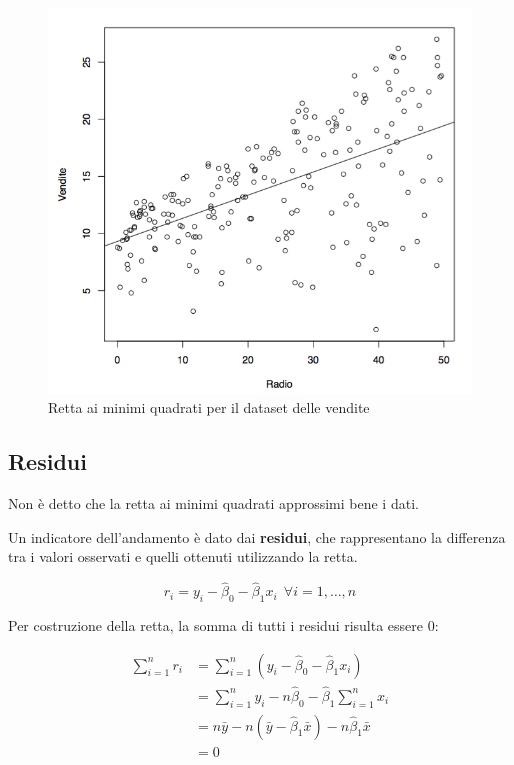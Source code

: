 \begin{figure}[htbp]
\centering
\includegraphics{./notes/immagini/l3-figura5.png}
\caption{Retta ai minimi quadrati per il dataset delle vendite}
\end{figure}

\subsection{Residui}\label{residui}

Non è detto che la retta ai minimi quadrati approssimi bene i dati.

Un indicatore dell'andamento è dato dai \textbf{residui}, che
rappresentano la differenza tra i valori osservati e quelli ottenuti
utilizzando la retta.

$$ r_i = y_i - \hat{\beta}_0 - \hat{\beta}_1x_i \: \: \forall i = 1, \ldots, n$$

Per costruzione della retta, la somma di tutti i residui risulta essere
0:

\begin{align*}
	\sum\limits_{i=1}^{n} r_i &= \sum\limits_{i=1}^{n} (y_i - \hat{\beta}_0 - \hat{\beta}_1x_i)\\
												&= \sum\limits_{i=1}^{n} y_i -n\hat{\beta}_0 - \hat{\beta}_1\sum\limits_{i=1}^{n}x_i\\
												&= n\bar{y} -n(\bar{y}-\hat{\beta}_1\bar{x}) - n \hat{\beta}_1 \bar{x}\\
												&= 0
\end{align*}

